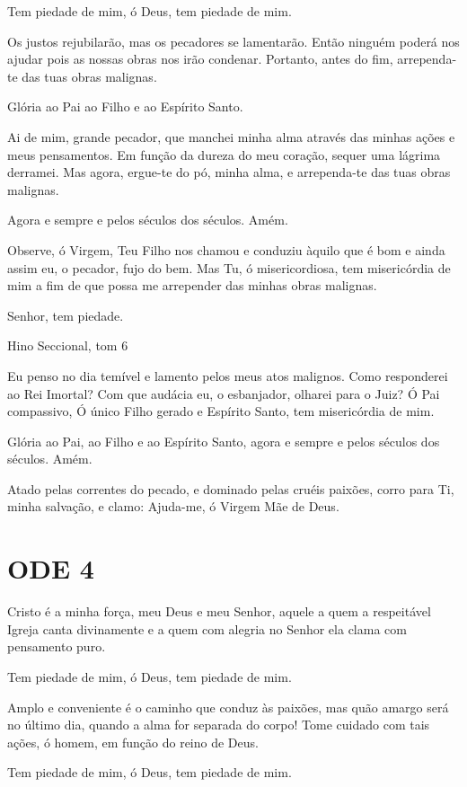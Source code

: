 \documentclass{subfiles}
\begin{document}
Tem piedade de mim, ó Deus, tem piedade de mim.

Os justos rejubilarão, mas os pecadores se lamentarão. Então ninguém poderá nos
ajudar pois as nossas obras nos irão condenar. Portanto, antes do fim,
arrependa-te das tuas obras malignas.

Glória ao Pai ao Filho e ao Espírito Santo.

Ai de mim, grande pecador, que manchei minha alma através das minhas ações e
meus pensamentos. Em função da dureza do meu coração, sequer uma lágrima
derramei. Mas agora, ergue-te do pó, minha alma, e arrependa-te das tuas obras
malignas.

Agora e sempre e pelos séculos dos séculos. Amém.

\theotokion{}Observe, ó Virgem, Teu Filho nos chamou e conduziu àquilo que é bom
e ainda assim eu, o pecador, fujo do bem. Mas Tu, ó misericordiosa, tem
misericórdia de mim a fim de que possa me arrepender das minhas obras malignas.

Senhor, tem piedade. 

Hino Seccional, tom 6

Eu penso no dia temível e lamento pelos meus atos malignos. Como responderei ao
Rei Imortal? Com que audácia eu, o esbanjador, olharei para o Juiz? Ó Pai
compassivo, Ó único Filho gerado e Espírito Santo, tem misericórdia de mim.

Glória ao Pai, ao Filho e ao Espírito Santo, agora e sempre e pelos séculos dos
séculos. Amém.

\theotokion{}Atado pelas correntes do pecado, e dominado pelas cruéis paixões,
corro para Ti, minha salvação, e clamo: Ajuda-me, ó Virgem Mãe de Deus.

\section*{ODE 4}

\eirmos{}Cristo é a minha força, meu Deus e meu Senhor, aquele a quem a
respeitável Igreja canta divinamente e a quem com alegria no Senhor ela clama
com pensamento puro.

Tem piedade de mim, ó Deus, tem piedade de mim.

Amplo e conveniente é o caminho que conduz às paixões, mas quão amargo será no
último dia, quando a alma for separada do corpo! Tome cuidado com tais ações, ó
homem, em função do reino de Deus.

Tem piedade de mim, ó Deus, tem piedade de mim.
\end{document}
